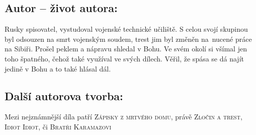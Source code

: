 \documentclass{extarticle} %
\begin{document}


\subsection*{Autor {\ssmall -- život autora:}}
\noindent 
Rusky spisovatel, vystudoval vojenské technické učiliště. S celou svojí skupinou byl odsouzen na smrt vojenským soudem, trest jim byl změněn na~nucené práce na Sibiři. Prošel peklem a nápravu shledal v Bohu. Ve svém okolí si všímal jen toho špatného, čehož také využíval ve svých dílech. Věřil, že spása se dá najít jedině v Bohu a to také hlásal dál.


\subsection*{Další autorova tvorba:}
\noindent 
Mezi nejznámnější díla patří \textsc{Zápisky z mrtvého domu}, právě \textsc{Zločin a trest}, \textsc{Idiot Idiot}, či \textsc{Bratři Karamazovi}




\end{document}
